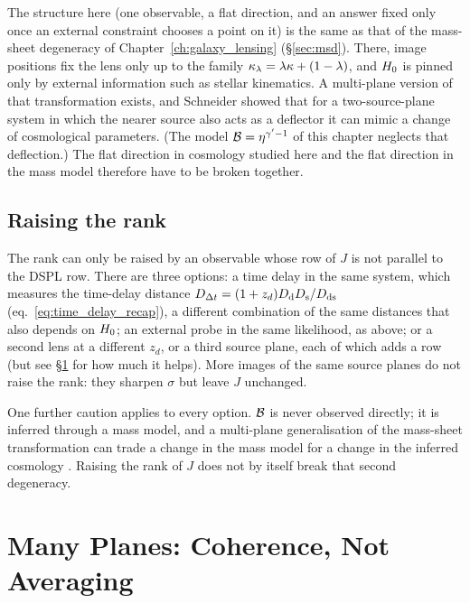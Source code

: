 \begin{bridge}
The structure here (one observable, a flat direction, and an answer
fixed only once an external constraint chooses a point on it) is the same
as that of the mass-sheet degeneracy of Chapter~\ref{ch:galaxy_lensing}
(\S\ref{sec:msd}). There, image positions fix the lens only up to the
family $\kappa_\lambda=\lambda\kappa+(1-\lambda)$, and $H_0$ is
pinned only by external information such as stellar kinematics. A
multi-plane version of that transformation exists, and Schneider
\citep{schneider_2014_multiplane} showed that for a two-source-plane
system in which the nearer source also acts as a deflector it can mimic a
change of cosmological parameters. (The model $\mathcal{B}=\eta^{\gamma'-1}$
of this chapter neglects that deflection.) The flat
direction in cosmology studied here and the flat direction in the mass
model therefore have to be broken together.
\end{bridge}

\subsection{Raising the rank}

The rank can only be raised by an observable whose row of $J$ is
not parallel to the DSPL row. There are three options: a time delay in
the same system, which measures the time-delay distance
$D_{\Delta t}=(1+z_d)D_{\mathrm{d}}D_{\mathrm{s}}/D_{\mathrm{ds}}$ (eq.~\ref{eq:time_delay_recap}), a
different combination of the same distances that also depends on
$H_0$; an external probe in the same likelihood, as above; or a
second lens at a different $z_d$, or a third source plane, each of which
adds a row (but see \S\ref{sec:cs_coherence} for how much it helps).
More images of the same source planes do not raise the rank: they
sharpen $\sigma$ but leave $J$ unchanged.

One further caution applies to every option. $\mathcal{B}$ is never observed
directly; it is inferred through a mass model, and a multi-plane
generalisation of the mass-sheet transformation can trade a change in
the mass model for a change in the inferred cosmology
\citep{schneider_2014_multiplane}. Raising the rank of $J$ does not by
itself break that second degeneracy.


\section{Many Planes: Coherence, Not Averaging}
\label{sec:cs_coherence}

